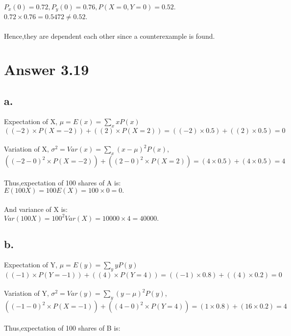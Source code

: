 \documentclass[12pt]{article}
\begin{document}
$P_x(0)=0.72,P_y(0)=0.76,P(X = 0,Y = 0) = 0.52$.\\

$0.72 \times 0.76 = 0.5472 \neq 0.52$.\\\\
Hence,they are dependent each other since a counterexample is found.
   
\section*{Answer 3.19}

\subsection*{a.}
Expectation of X, $\mu=E(x)=\sum\limits_{x} xP(x)$\\

$((-2)\times P(X = -2))+((2)\times P(X = 2))=((-2)\times 0.5)+((2)\times 0.5)=0$\\\\
Variation of X, $\sigma^2=Var(x)=\sum\limits_{x} (x-\mu)^2P(x)$,\\

$((-2-0)^2\times P(X = -2))+((2-0)^2\times P(X = 2))=(4\times 0.5)+(4\times 0.5)=4$\\\\
Thus,expectation of 100 shares of A is:\\

$E(100X) = 100E(X) = 100\times 0 = 0.$\\\\
And variance of X is:\\

$Var(100X) = 100^2Var(X) = 10000\times 4 = 40000.$


\subsection*{b.}

Expectation of Y, $\mu=E(y)=\sum\limits_{y} yP(y)$\\

$((-1)\times P(Y = -1))+((4)\times P(Y = 4))=((-1)\times 0.8)+((4)\times 0.2)=0$\\\\
Variation of Y, $\sigma^2=Var(y)=\sum\limits_{y} (y-\mu)^2P(y)$,\\

$((-1-0)^2\times P(X = -1))+((4-0)^2\times P(Y = 4))=(1\times 0.8)+(16\times 0.2)=4$\\\\
Thus,expectation of 100 shares of B is:\\
\end{document}

